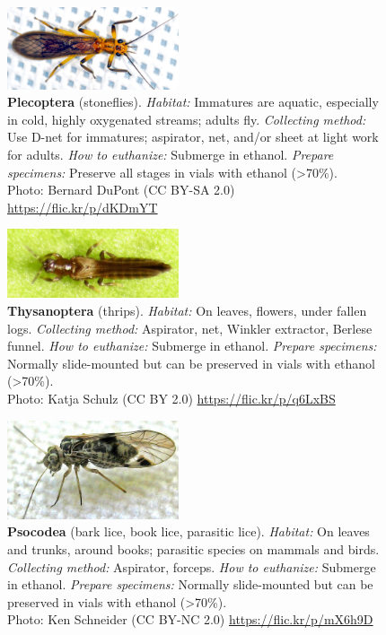 \documentclass[letterpaper, 11pt]{article}
\begin{document}
\begin{figure}
  \caption*{\textbf{Plecoptera} (stoneflies). \textit{Habitat:} Immatures are aquatic, especially in cold, highly oxygenated streams; adults fly. \textit{Collecting method:} Use D-net for immatures; aspirator, net, and/or sheet at light work for adults. \textit{How to euthanize:} Submerge in ethanol. \textit{Prepare specimens:} Preserve all stages in vials with ethanol (\textgreater70\%).\\ Photo: Bernard DuPont (CC BY-SA 2.0) \url{https://flic.kr/p/dKDmYT}}
  \includegraphics[width=0.45\textwidth]{Plecoptera}
\end{figure}

\clearpage

\begin{figure}
  \caption*{\textbf{Thysanoptera} (thrips). \textit{Habitat:} On leaves, flowers, under fallen logs. \textit{Collecting method:} Aspirator, net, Winkler extractor, Berlese funnel. \textit{How to euthanize:} Submerge in ethanol. \textit{Prepare specimens:} Normally slide-mounted but can be preserved in vials with ethanol (\textgreater70\%).\\ Photo: Katja Schulz (CC BY 2.0) \url{https://flic.kr/p/q6LxBS}}
  \includegraphics[width=0.45\textwidth]{Thysanoptera}
\end{figure}

\begin{figure}
  \caption*{\textbf{Psocodea} (bark lice, book lice, parasitic lice). \textit{Habitat:} On leaves and trunks, around books; parasitic species on mammals and birds. \textit{Collecting method:} Aspirator, forceps. \textit{How to euthanize:} Submerge in ethanol. \textit{Prepare specimens:} Normally slide-mounted but can be preserved in vials with ethanol (\textgreater70\%).\\ Photo: Ken Schneider (CC BY-NC 2.0) \url{https://flic.kr/p/mX6h9D}}
  \includegraphics[width=0.45\textwidth]{PsocodeaBark}
\end{figure}
\end{document}
